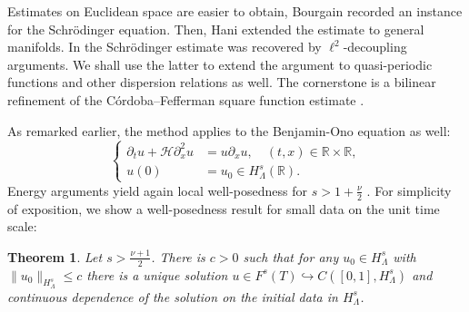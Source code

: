 \documentclass{amsart}
\newtheorem{theorem}{Theorem}[section]
\theoremstyle{definition}
\newcommand{\R}{\mathbb{R}}
\newcommand{\T}{\mathbb{T}}
\begin{document}
Estimates on Euclidean space are easier to obtain, Bourgain \cite{Bourgain1998} recorded an instance for the Schr\"odinger equation.
Then, Hani \cite{Hani2012} extended the estimate to general manifolds. In \cite{Schippa2025Trilinear} the Schr\"odinger estimate was recovered by $\ell^2$-decoupling arguments. We shall use the latter to extend the argument to quasi-periodic functions and other dispersion relations as well. The cornerstone is a bilinear refinement of the C\'ordoba--Fefferman square function estimate \cite{Fefferman1973,Cordoba1979,Cordoba1982}.

\smallskip

As remarked earlier, the method applies to the Benjamin-Ono equation as well:
\begin{equation}
\label{eq:BOIntroduction}
\left\{ \begin{array}{cl}
\partial_t u + \mathcal{H} \partial_x^2 u &= u \partial_x u, \quad (t,x) \in \R \times \R, \\
u(0) &= u_0 \in H_{\Lambda}^s(\R).
\end{array} \right.
\end{equation}
Energy arguments yield again local well-posedness for $s > 1 + \frac{\nu}{2}$ \cite{AitzhanAmbrose2024}. For simplicity of exposition, we show a well-posedness result for small data on the unit time scale:
\begin{theorem}
\label{thm:QPBenjaminOno}
Let $s>\frac{\nu+1}{2}$. There is $c>0$ such that for any $u_0 \in H^s_{\Lambda}$ with $\| u_0 \|_{H^s_\Lambda} \leq c$ there is a unique solution $u \in F^s(T) \hookrightarrow C([0,1],H^s_{\Lambda})$ and continuous dependence of the solution on the initial data in $H^s_\Lambda$.
\end{theorem}

\end{document}
